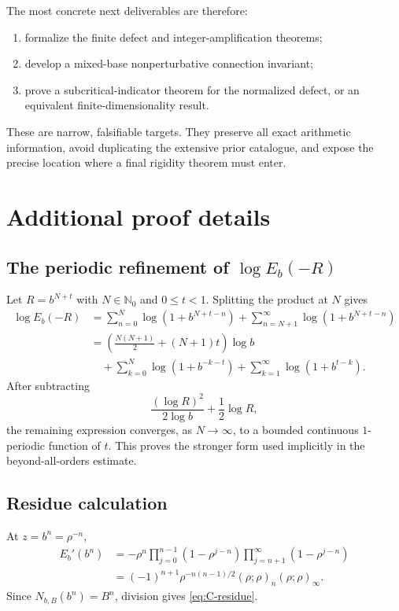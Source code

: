 \documentclass[11pt]{article}
\theoremstyle{definition}
\newcommand{\N}{\mathbb{N}}
\newcommand{\qpf}[3]{\left(#1;#2\right)_{#3}}
\newcommand{\qpi}[2]{\left(#1;#2\right)_{\!\infty}}
\begin{document}
The most concrete next deliverables are therefore:
\begin{enumerate}
  \item formalize the finite defect and integer-amplification theorems;
  \item develop a mixed-base nonperturbative connection invariant;
  \item prove a subcritical-indicator theorem for the normalized defect, or an equivalent finite-dimensionality result.
\end{enumerate}
These are narrow, falsifiable targets.  They preserve all exact arithmetic information, avoid duplicating the extensive prior catalogue, and expose the precise location where a final rigidity theorem must enter.

\appendix

\section{Additional proof details}

\subsection{The periodic refinement of $\log E_b(-R)$}

Let $R=b^{N+t}$ with $N\in\N_0$ and $0\le t<1$.  Splitting the product at $N$ gives
\begin{align*}
 \log E_b(-R)
 &=\sum_{n=0}^{N}\log(1+b^{N+t-n})
   +\sum_{n=N+1}^{\infty}\log(1+b^{N+t-n})\\
 &=\left(\frac{N(N+1)}2+(N+1)t\right)\log b\\
 &\quad+\sum_{k=0}^{N}\log(1+b^{-k-t})
   +\sum_{k=1}^{\infty}\log(1+b^{t-k}).
\end{align*}
After subtracting
\[
 \frac{(\log R)^2}{2\log b}+\frac12\log R,
\]
the remaining expression converges, as $N\to\infty$, to a bounded continuous $1$-periodic function of $t$.  This proves the stronger form used implicitly in the beyond-all-orders estimate.

\subsection{Residue calculation}

At $z=b^n=\rho^{-n}$,
\begin{align*}
 E_b'(b^n)
 &=-\rho^n
 \prod_{j=0}^{n-1}(1-\rho^{j-n})
 \prod_{j=n+1}^{\infty}(1-\rho^{j-n})\\
 &=(-1)^{n+1}\rho^{-n(n-1)/2}
   \qpf{\rho}{\rho}{n}\qpi{\rho}{\rho}.
\end{align*}
Since $N_{b,B}(b^n)=B^n$, division gives \eqref{eq:C-residue}.
\end{document}
